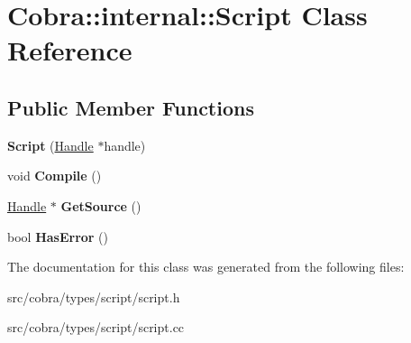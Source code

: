 \hypertarget{class_cobra_1_1internal_1_1_script}{\section{Cobra\+:\+:internal\+:\+:Script Class Reference}
\label{class_cobra_1_1internal_1_1_script}
}
\subsection*{Public Member Functions}
\begin{DoxyCompactItemize}
\item 
\hypertarget{class_cobra_1_1internal_1_1_script_abbbb976f7191b7a15e42c62ea126b94f}{{\bfseries Script} (\hyperlink{class_cobra_1_1internal_1_1_handle}{Handle} $\ast$handle)}\label{class_cobra_1_1internal_1_1_script_abbbb976f7191b7a15e42c62ea126b94f}

\item 
\hypertarget{class_cobra_1_1internal_1_1_script_a4bf8df38004b8c9e499b42d2f1141754}{void {\bfseries Compile} ()}\label{class_cobra_1_1internal_1_1_script_a4bf8df38004b8c9e499b42d2f1141754}

\item 
\hypertarget{class_cobra_1_1internal_1_1_script_af7e4c059682b56d466083f5ee2b0435d}{\hyperlink{class_cobra_1_1internal_1_1_handle}{Handle} $\ast$ {\bfseries Get\+Source} ()}\label{class_cobra_1_1internal_1_1_script_af7e4c059682b56d466083f5ee2b0435d}

\item 
\hypertarget{class_cobra_1_1internal_1_1_script_a6280b18bbd397e78a6434fa32d82f004}{bool {\bfseries Has\+Error} ()}\label{class_cobra_1_1internal_1_1_script_a6280b18bbd397e78a6434fa32d82f004}

\end{DoxyCompactItemize}


The documentation for this class was generated from the following files\+:\begin{DoxyCompactItemize}
\item 
src/cobra/types/script/script.\+h\item 
src/cobra/types/script/script.\+cc\end{DoxyCompactItemize}
